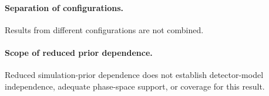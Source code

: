 \paragraph{Separation of configurations.} Results from different configurations are not combined.

\paragraph{Scope of reduced prior dependence.} Reduced simulation-prior dependence does not establish detector-model independence, adequate phase-space support, or coverage for this result.

